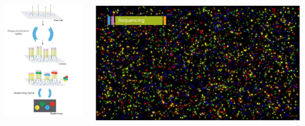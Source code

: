 \documentclass[x11names, svgnames]{beamer}
\begin{document}
\begin{frame}
  \frametitle{\three}
  \begin{columns}[T]
    \begin{column}{0.5\textwidth}
      \begin{center}
        \vspace{-2em}
        \includegraphics[scale=0.55]{images/illumina_sequencing}
      \end{center}
    \end{column}
    \begin{column}{0.5\textwidth}
      \begin{center}
        \vspace{-1em}
        \includegraphics[scale=0.15]{images/illumina_video}

\end{center}
\end{column}
\end{columns}
\end{frame}
\end{document}
